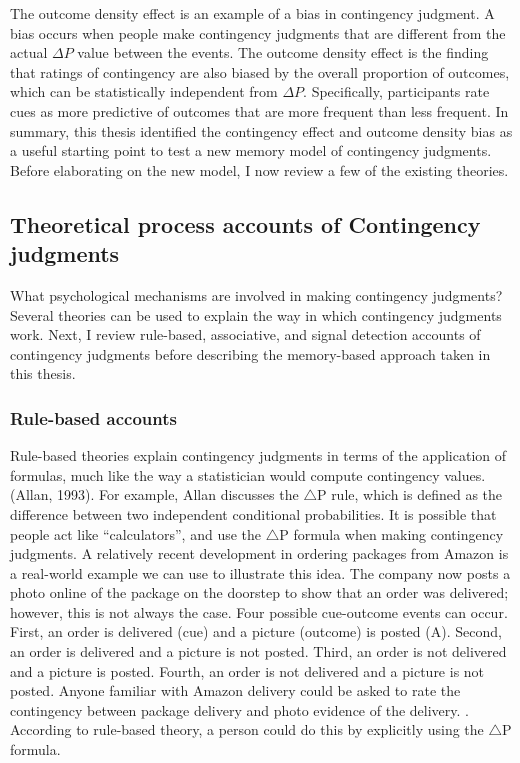 \documentclass[
  english,
  man,floatsintext]{apa6}
\begin{document}
The outcome density effect is an example of a bias in contingency judgment. A bias occurs when people make contingency judgments that are different from the actual \(\Delta P\) value between the events. The outcome density effect is the finding that ratings of contingency are also biased by the overall proportion of outcomes, which can be statistically independent from \(\Delta P\). Specifically, participants rate cues as more predictive of outcomes that are more frequent than less frequent. In summary, this thesis identified the contingency effect and outcome density bias as a useful starting point to test a new memory model of contingency judgments. Before elaborating on the new model, I now review a few of the existing theories.

\hypertarget{theoretical-process-accounts-of-contingency-judgments}{%
\subsection{Theoretical process accounts of Contingency judgments}\label{theoretical-process-accounts-of-contingency-judgments}}

What psychological mechanisms are involved in making contingency judgments? Several theories can be used to explain the way in which contingency judgments work. Next, I review rule-based, associative, and signal detection accounts of contingency judgments before describing the memory-based approach taken in this thesis.

\hypertarget{rule-based-accounts}{%
\subsubsection{Rule-based accounts}\label{rule-based-accounts}}

Rule-based theories explain contingency judgments in terms of the application of formulas, much like the way a statistician would compute contingency values. (Allan, 1993). For example, Allan discusses the \(\triangle\)P rule, which is defined as the difference between two independent conditional probabilities. It is possible that people act like \enquote{calculators}, and use the \(\triangle\)P formula when making contingency judgments. A relatively recent development in ordering packages from Amazon is a real-world example we can use to illustrate this idea. The company now posts a photo online of the package on the doorstep to show that an order was delivered; however, this is not always the case. Four possible cue-outcome events can occur. First, an order is delivered (cue) and a picture (outcome) is posted (A). Second, an order is delivered and a picture is not posted. Third, an order is not delivered and a picture is posted. Fourth, an order is not delivered and a picture is not posted. Anyone familiar with Amazon delivery could be asked to rate the contingency between package delivery and photo evidence of the delivery. . According to rule-based theory, a person could do this by explicitly using the \(\triangle\)P formula.
\end{document}
